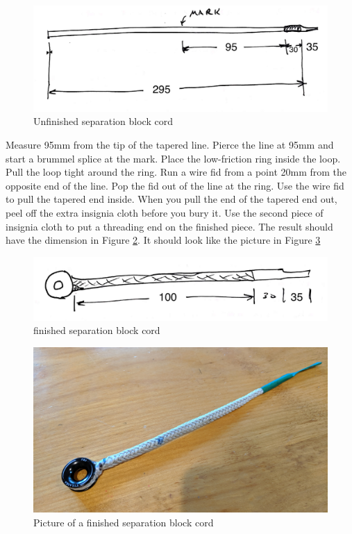 \documentclass[]{book}
\begin{document}
\begin{figure}

{\centering \includegraphics[width=0.7\linewidth]{images/unfinished_separation_block_cord} 

}

\caption{Unfinished separation block cord}\label{fig:unfinished-separation-block-cord}
\end{figure}

Measure 95mm from the tip of the tapered line. Pierce the line at 95mm and start a brummel splice at the mark. Place the low-friction ring inside the loop. Pull the loop tight around the ring. Run a wire fid from a point 20mm from the opposite end of the line. Pop the fid out of the line at the ring. Use the wire fid to pull the tapered end inside. When you pull the end of the tapered end out, peel off the extra insignia cloth before you bury it. Use the second piece of insignia cloth to put a threading end on the finished piece. The result should have the dimension in Figure \ref{fig:finished-separation-block-cord}. It should look like the picture in Figure \ref{fig:finished-separation-block-cord-pic}

\begin{figure}

{\centering \includegraphics[width=0.7\linewidth]{images/finished_separation_block_cord} 

}

\caption{finished separation block cord}\label{fig:finished-separation-block-cord}
\end{figure}

\begin{figure}

{\centering \includegraphics[width=0.7\linewidth]{images/finished_separation_block_cord_pic} 

}

\caption{Picture of a finished separation block cord}\label{fig:finished-separation-block-cord-pic}
\end{figure}
\end{document}
